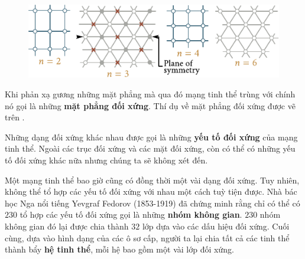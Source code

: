 \begin{figure}[!htb]
	\begin{center}
		\includegraphics[scale=1.1]{figures/ch_13/fig_13_3.pdf}
		\caption[]{}
		\label{fig:13_3}
	\end{center}
	\vspace{-0.8cm}
\end{figure}


Khi phản xạ gương những mặt phẳng mà qua đó mạng tinh thể trùng với chính nó gọi là những \textbf{mặt phẳng đối xứng}. Thí dụ về mặt phẳng đối xứng được vẽ trên .


Những dạng đối xứng khác nhau được gọi là những \textbf{yếu tố đối xứng} của mạng tinh thể. Ngoài các trục đối xứng và các mặt đối xứng, còn có thể có những yếu tố đối xứng khác nữa nhưng chúng ta sẽ không xét đến.


Một mạng tinh thể bao giờ cũng có đồng thời một vài dạng đối xứng. Tuy nhiên, không thể tổ hợp các yếu tố đối xứng với nhau một cách tuỳ tiện được. Nhà bác học Nga nổi tiếng Yevgraf Fedorov (1853-1919) đã chứng minh rằng chỉ có thể có $230$ tổ hợp các yếu tố đối xứng gọi là những \textbf{nhóm không gian}. $230$ nhóm không gian đó lại được chia thành $32$ lớp dựa vào các dấu hiệu đối xứng. Cuối cùng, dựa vào hình dạng của các ô sơ cấp, người ta lại chia tất cả các tinh thể thành bẩy \textbf{hệ tinh thể}, mỗi hệ bao gồm một vài lớp đối xứng.

